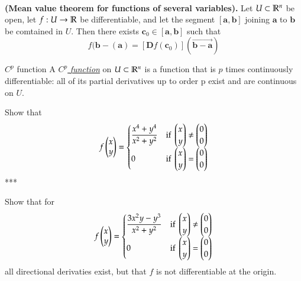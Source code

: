 \\

\begin{theorem}
  \textbf{(Mean value theorem for functions of several variables).} Let $U \subset \mathbb{R}^n$ be open, let $f : U \to \mathbb{R}$ be differentiable, and let the segment $[\bm{a},\bm{b}]$ joining $\bm{a}$ to $\bm{b}$ be comtained in $U$. Then there exists $\bm{c}_0\in [\bm{a},\bm{b}]$ such that
  \[f(\bm{b}-(\bm{a})= [\bm{D}f(\bm{c}_0)](\vec{\bm{b}-\bm{a}})\]
\end{theorem}

\begin{defn}{$C^p$ function}
A \ul{$C^p$ \emph{function}} on $U\subset \mathbb{R}^n$ is a function that is $p$ times continuously differentiable: all of its partial derivatives up to order p exist and are continuous on $U$.
\end{defn}

Show that
\[f\begin{pmatrix} x \\ y \end{pmatrix} = \begin{cases} \displaystyle
\frac{x^4+y^4}{x^2+y^2} & \text{if } \begin{pmatrix} x \\ y \end{pmatrix}\neq \begin{pmatrix} 0 \\ 0 \end{pmatrix} \\
0 & \text{if } \begin{pmatrix} x \\ y \end{pmatrix} = \begin{pmatrix} 0 \\ 0 \end{pmatrix}\end{cases}
\]
***


  Show that for
  \[f\begin{pmatrix} x \\ y \end{pmatrix} = \begin{cases}
  \displaystyle \frac{3x^2y - y^3}{x^2+y^2} & \text{if } \begin{pmatrix} x \\ y \end{pmatrix} \neq \begin{pmatrix} 0 \\ 0 \end{pmatrix} \\
  0 & \text{if } \begin{pmatrix} x \\ y \end{pmatrix} = \begin{pmatrix} 0 \\ 0 \end{pmatrix}
  \end{cases}\]
  all directional derivaties exist, but that $f$ is not differentiable at the origin.
